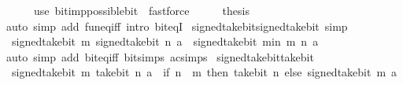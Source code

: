 \begin{isabellebody}
\ \ \ \ \ \ {\isacharparenleft}{\kern0pt}use\ bit{\isacharunderscore}{\kern0pt}imp{\isacharunderscore}{\kern0pt}possible{\isacharunderscore}{\kern0pt}bit\ \ fastforce{\isacharparenright}{\kern0pt}\isanewline
\ \ \isamarkupfalse%
\ \isamarkupfalse%
\ {\isacharquery}{\kern0pt}thesis\isanewline
\ \ \ \ \isamarkupfalse%
\ {\isacharparenleft}{\kern0pt}auto\ simp\ add{\isacharcolon}{\kern0pt}\ fun{\isacharunderscore}{\kern0pt}eq{\isacharunderscore}{\kern0pt}iff\ intro{\isacharcolon}{\kern0pt}\ bit{\isacharunderscore}{\kern0pt}eqI{\isacharparenright}{\kern0pt}\isanewline
{}\isamarkupfalse%
%
\endisatagproof
{\isafoldproof}%
%
\isadelimproof
\isanewline
%
\endisadelimproof
\isanewline
{}\isamarkupfalse%
\ signed{\isacharunderscore}{\kern0pt}take{\isacharunderscore}{\kern0pt}bit{\isacharunderscore}{\kern0pt}signed{\isacharunderscore}{\kern0pt}take{\isacharunderscore}{\kern0pt}bit\ {\isacharbrackleft}{\kern0pt}simp{\isacharbrackright}{\kern0pt}{\isacharcolon}{\kern0pt}\isanewline
\ \ {\isacartoucheopen}signed{\isacharunderscore}{\kern0pt}take{\isacharunderscore}{\kern0pt}bit\ m\ {\isacharparenleft}{\kern0pt}signed{\isacharunderscore}{\kern0pt}take{\isacharunderscore}{\kern0pt}bit\ n\ a{\isacharparenright}{\kern0pt}\ {\isacharequal}{\kern0pt}\ signed{\isacharunderscore}{\kern0pt}take{\isacharunderscore}{\kern0pt}bit\ {\isacharparenleft}{\kern0pt}min\ m\ n{\isacharparenright}{\kern0pt}\ a{\isacartoucheclose}\isanewline
%
\isadelimproof
\ \ %
\endisadelimproof
%
\isatagproof
{}\isamarkupfalse%
\ {\isacharparenleft}{\kern0pt}auto\ simp\ add{\isacharcolon}{\kern0pt}\ bit{\isacharunderscore}{\kern0pt}eq{\isacharunderscore}{\kern0pt}iff\ bit{\isacharunderscore}{\kern0pt}simps\ ac{\isacharunderscore}{\kern0pt}simps{\isacharparenright}{\kern0pt}%
\endisatagproof
{\isafoldproof}%
%
\isadelimproof
\isanewline
%
\endisadelimproof
\isanewline
{}\isamarkupfalse%
\ signed{\isacharunderscore}{\kern0pt}take{\isacharunderscore}{\kern0pt}bit{\isacharunderscore}{\kern0pt}take{\isacharunderscore}{\kern0pt}bit{\isacharcolon}{\kern0pt}\isanewline
\ \ {\isacartoucheopen}signed{\isacharunderscore}{\kern0pt}take{\isacharunderscore}{\kern0pt}bit\ m\ {\isacharparenleft}{\kern0pt}take{\isacharunderscore}{\kern0pt}bit\ n\ a{\isacharparenright}{\kern0pt}\ {\isacharequal}{\kern0pt}\ {\isacharparenleft}{\kern0pt}if\ n\ {\isasymle}\ m\ then\ take{\isacharunderscore}{\kern0pt}bit\ n\ else\ signed{\isacharunderscore}{\kern0pt}take{\isacharunderscore}{\kern0pt}bit\ m{\isacharparenright}{\kern0pt}\ a{\isacartoucheclose}\isanewline

\end{isabellebody}
